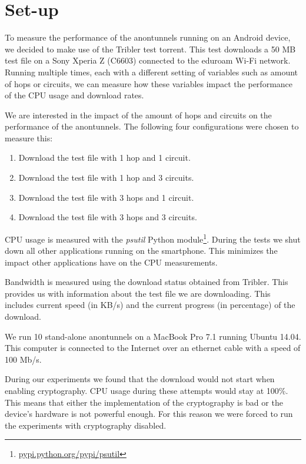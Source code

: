 % 
\section{Set-up}
	\label{sec:experiments:approach}
	To measure the performance of the anontunnels running on an Android device, we decided to make use of the Tribler test torrent. This test downloads a 50 MB test file on a Sony Xperia Z (C6603)  connected to the eduroam Wi-Fi network. Running multiple times, each with a different setting of variables such as amount of hops or circuits, we can measure how these variables impact the performance of the CPU usage and download rates.
	
	We are interested in the impact of the amount of hops and circuits on the performance of the anontunnels. The following four configurations were chosen to measure this:
	
	\begin{enumerate}
		\item Download the test file with 1 hop and 1 circuit.
		\item Download the test file with 1 hop and 3 circuits.
		\item Download the test file with 3 hops and 1 circuit.
		\item Download the test file with 3 hops and 3 circuits.
	\end{enumerate}
	
	CPU usage is measured with the \emph{psutil} Python module\footnote{\href{https://pypi.python.org/pypi/psutil}{pypi.python.org/pypi/psutil}}. During the tests we shut down all other applications running on the smartphone. This minimizes the impact other applications have on the CPU measurements.
	
	Bandwidth is measured using the download status obtained from Tribler. This provides us with information about the test file we are downloading. This includes current speed (in KB/s) and the current progress (in percentage) of the download.
	
	We run 10 stand-alone anontunnels on a MacBook Pro 7.1 running Ubuntu 14.04. This computer is connected to the Internet over an ethernet cable with a speed of 100 Mb/s. 
	
	During our experiments we found that the download would not start when enabling cryptography. CPU usage during these attempts would stay at 100\%. This means that either the implementation of the cryptography is bad or the device's hardware is not powerful enough. For this reason we were forced to run the experiments with cryptography disabled.
	

